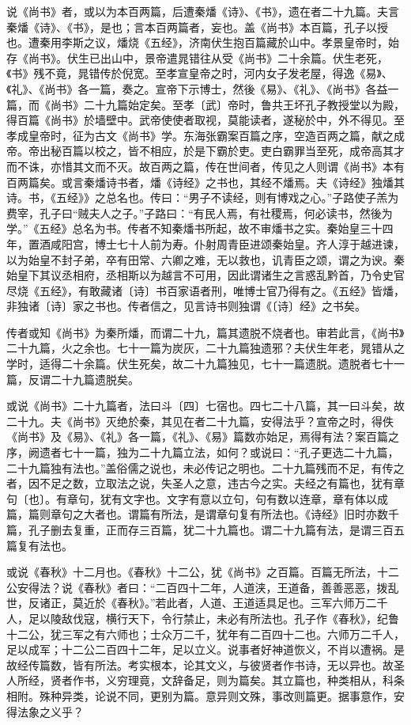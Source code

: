\documentclass[]{article}
\begin{document}
说《尚书》者，或以为本百两篇，后遭秦燔《诗》、《书》，遗在者二十九篇。夫言秦燔《诗》、《书》，是也；言本百两篇者，妄也。盖《尚书》本百篇，孔子以授也。遭秦用李斯之议，燔烧《五经》，济南伏生抱百篇藏於山中。孝景皇帝时，始存《尚书》。伏生已出山中，景帝遣晁错往从受《尚书》二十余篇。伏生老死，《书》残不竟，晁错传於倪宽。至孝宣皇帝之时，河内女子发老屋，得逸《易》、《礼》、《尚书》各一篇，奏之。宣帝下示博士，然後《易》、《礼》、《尚书》各益一篇，而《尚书》二十九篇始定矣。至孝〔武〕帝时，鲁共王坏孔子教授堂以为殿，得百篇《尚书》於墙壁中。武帝使使者取视，莫能读者，遂秘於中，外不得见。至孝成皇帝时，征为古文《尚书》学。东海张霸案百篇之序，空造百两之篇，献之成帝。帝出秘百篇以校之，皆不相应，於是下霸於吏。吏白霸罪当至死，成帝高其才而不诛，亦惜其文而不灭。故百两之篇，传在世间者，传见之人则谓《尚书》本有百两篇矣。或言秦燔诗书者，燔《诗经》之书也，其经不燔焉。夫《诗经》独燔其诗。书，《五经》》之总名也。传曰：``男子不读经，则有博戏之心。''子路使子羔为费宰，孔子曰``贼夫人之子。''子路曰：``有民人焉，有社稷焉，何必读书，然後为学。''《五经》总名为书。传者不知秦燔书所起，故不审燔书之实。秦始皇三十四年，置酒咸阳宫，博士七十人前为寿。仆射周青臣进颂秦始皇。齐人淳于越进谏，以为始皇不封子弟，卒有田常、六卿之难，无以救也，讥青臣之颂，谓之为谀。秦始皇下其议丞相府，丞相斯以为越言不可用，因此谓诸生之言惑乱黔首，乃令史官尽烧《五经》，有敢藏诸〔诗〕书百家语者刑，唯博士官乃得有之。《五经》皆燔，非独诸〔诗〕家之书也。传者信之，见言诗书则独谓《〔诗〕经》之书矣。

传者或知《尚书》为秦所燔，而谓二十九，篇其遗脱不烧者也。审若此言，《尚书》二十九篇，火之余也。七十一篇为炭灰，二十九篇独遗邪？夫伏生年老，晁错从之学时，适得二十余篇。伏生死矣，故二十九篇独见，七十一篇遗脱。遗脱者七十一篇，反谓二十九篇遗脱矣。

或说《尚书》二十九篇者，法曰斗〔四〕七宿也。四七二十八篇，其一曰斗矣，故二十九。夫《尚书》灭绝於秦，其见在者二十九篇，安得法乎？宣帝之时，得佚《尚书》及《易》、《礼》各一篇，《礼》、《易》篇数亦始足，焉得有法？案百篇之序，阙遗者七十一篇，独为二十九篇立法，如何？或说曰：``孔子更选二十九篇，二十九篇独有法也。''盖俗儒之说也，未必传记之明也。二十九篇残而不足，有传之者，因不足之数，立取法之说，失圣人之意，违古今之实。夫经之有篇也，犹有章句〔也〕。有章句，犹有文字也。文字有意以立句，句有数以连章，章有体以成篇，篇则章句之大者也。谓篇有所法，是谓章句复有所法也。《诗经》旧时亦数千篇，孔子删去复重，正而存三百篇，犹二十九篇也。谓二十九篇有法，是谓三百五篇复有法也。

或说《春秋》十二月也。《春秋》十二公，犹《尚书》之百篇。百篇无所法，十二公安得法？说《春秋》者曰：``二百四十二年，人道浃，王道备，善善恶恶，拨乱世，反诸正，莫近於《春秋》。''若此者，人道、王道适具足也。三军六师万二千人，足以陵敌伐寇，横行天下，令行禁止，未必有所法也。孔子作《春秋》，纪鲁十二公，犹三军之有六师也；士众万二千，犹年有二百四十二也。六师万二千人，足以成军；十二公二百四十二年，足以立义。说事者好神道恢义，不肖以遭祸。是故经传篇数，皆有所法。考实根本，论其文义，与彼贤者作书诗，无以异也。故圣人所经，贤者作书，义穷理竟，文辞备足，则为篇矣。其立篇也，种类相从，科条相附。殊种异类，论说不同，更别为篇。意异则文殊，事改则篇更。据事意作，安得法象之义乎？
\end{document}
